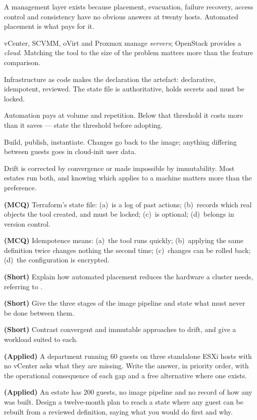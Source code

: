 \begin{chaptersummary}
\begin{tight}
  \item A management layer exists because placement, evacuation, failure
        recovery, access control and consistency have no obvious answers at
        twenty hosts. Automated placement is what pays for it.
  \item vCenter, SCVMM, oVirt and Proxmox manage \emph{servers}; OpenStack
        provides a \emph{cloud}. Matching the tool to the size of the problem
        matters more than the feature comparison.
  \item Infrastructure as code makes the declaration the artefact: declarative,
        idempotent, reviewed. The state file is authoritative, holds secrets
        and must be locked.
  \item Automation pays at volume and repetition. Below that threshold it costs
        more than it saves --- state the threshold before adopting.
  \item Build, publish, instantiate. Changes go back to the image; anything
        differing between guests goes in cloud-init user data.
  \item Drift is corrected by convergence or made impossible by immutability.
        Most estates run both, and knowing which applies to a machine matters
        more than the preference.
\end{tight}
\end{chaptersummary}

\begin{reviewq}
  \item \textbf{(MCQ)} Terraform's state file: (a)~is a log of past actions;
        (b)~records which real objects the tool created, and must be locked;
        (c)~is optional; (d)~belongs in version control.
  \item \textbf{(MCQ)} Idempotence means: (a)~the tool runs quickly;
        (b)~applying the same definition twice changes nothing the second time;
        (c)~changes can be rolled back; (d)~the configuration is encrypted.
  \item \textbf{(Short)} Explain how automated placement reduces the hardware a
        cluster needs, referring to .
  \item \textbf{(Short)} Give the three stages of the image pipeline and state
        what must never be done between them.
  \item \textbf{(Short)} Contrast convergent and immutable approaches to drift,
        and give a workload suited to each.
  \item \textbf{(Applied)} A department running 60 guests on three standalone
        ESXi hosts with no vCenter asks what they are missing. Write the answer,
        in priority order, with the operational consequence of each gap and a
        free alternative where one exists.
  \item \textbf{(Applied)} An estate has 200 guests, no image pipeline and no
        record of how any was built. Design a twelve-month plan to reach a
        state where any guest can be rebuilt from a reviewed definition,
        saying what you would do first and why.
\end{reviewq}
